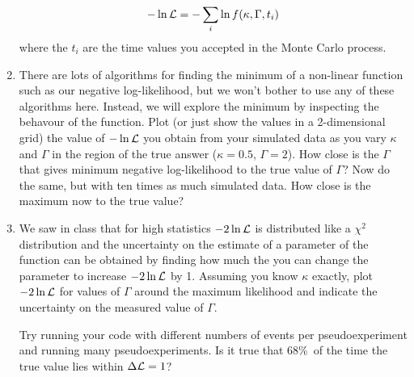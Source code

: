 \documentclass[12pt]{article}
\begin{document}
\begin{enumerate}
$$
- \ln {\cal L} = - \sum_i \ln f(\kappa, \Gamma, t_i)
$$
where the $t_i$ are the time values you accepted in the Monte Carlo process.
\item There are lots of algorithms for finding the 
minimum of a non-linear function such as our negative log-likelihood, 
but we won't bother to use any of
these algorithms here.
Instead, we will explore the minimum by inspecting the behavour of
the function.
Plot (or just show the values in a 2-dimensional grid) 
the value of $-\ln {\cal L}$ you obtain from your simulated data
as you vary $\kappa$ and $\Gamma$  
in the region  of the true answer ($\kappa=0.5$, $\Gamma=2$).  
How close is the $\Gamma $ that gives minimum negative
log-likelihood  to the true value of $\Gamma$? 
Now do the same,
but with ten times as much simulated data. How close is the maximum now to
the true value?
\item  We saw in class that for high statistics $-2\ln {\cal L}$ is 
distributed like a $\chi^2$ distribution and the uncertainty on
the estimate of a parameter of the function can be obtained by finding how much
the you can change the parameter to increase $-2\ln {\cal L}$ by
1. 
Assuming you know $\kappa$ exactly, plot  $-2\ln {\cal L}$ for
values of $\Gamma$ around the maximum likelihood and indicate
the uncertainty on the measured value of $\Gamma$.

\noindent
Try running your code with different numbers
of events per pseudoexperiment and running many pseudoexperiments. 
Is it true that 68\%\ of the time
the true value lies within $\Delta {\cal L} = 1$? 
\end{enumerate}
\end{document}
